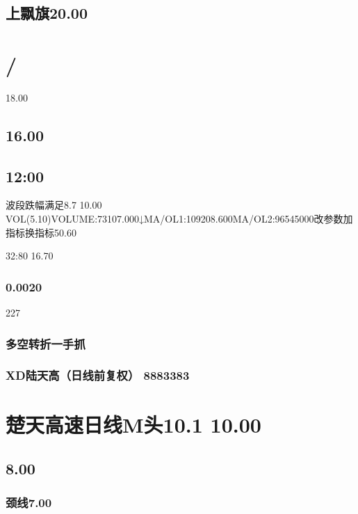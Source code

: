 \documentclass{article}
\begin{document}
\subsection{上飘旗20.00}

\section{/}

18.00

\subsection{16.00}

\subsection{12:00}

波段跌幅满足8.7 10.00 VOL(5.10)VOLUME:73107.000↓MA/OL1:109208.600MA/OL2:96545000改参数加指标换指标50.60

32:80 16.70

\subsubsection{0.0020}

227

\clearpage

\subsubsection{多空转折一手抓}

\subsubsection{XD陆天高（日线前复权） 8883383}

\section{楚天高速日线M头10.1 10.00}

\subsection{8.00}

\subsubsection{颈线7.00}
\end{document}
